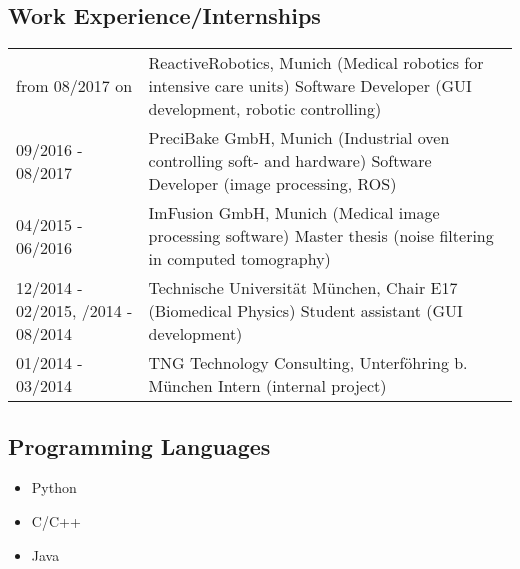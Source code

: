 \documentclass[a4paper,10pt]{memoir}
\begin{document}
\subsection*{Work Experience/Internships}
\vspace*{-\baselineskip}
\begin{longtable}{@{}p{} p{}}
  from 08/2017 on &
  ReactiveRobotics, Munich (Medical robotics for intensive care units) \newline
  Software Developer (GUI development, robotic controlling)
  \\
  09/2016 - 08/2017 &
  PreciBake GmbH, Munich (Industrial oven controlling soft- and hardware) \newline 
  Software Developer (image processing, ROS)
  \\
  04/2015 - 06/2016 &
  ImFusion GmbH, Munich (Medical image processing software) \newline 
  Master thesis (noise filtering in computed tomography)
  \\
  12/2014 - 02/2015, \newline
  06/2014 - 08/2014 &
  Technische Universität München, Chair E17 (Biomedical Physics) \newline 
  Student assistant (GUI development)
  \\
  01/2014 - 03/2014 &
  TNG Technology Consulting, Unterföhring b. München \newline 
  Intern (internal project)
\end{longtable}

\subsection*{Programming Languages}
\vspace*{-\baselineskip}
\begin{multicols}{3}
  \begin{itemize}
    \item Python
    \item C/C++
    \item Java 
  \end{itemize}
\end{multicols}
\end{document}
